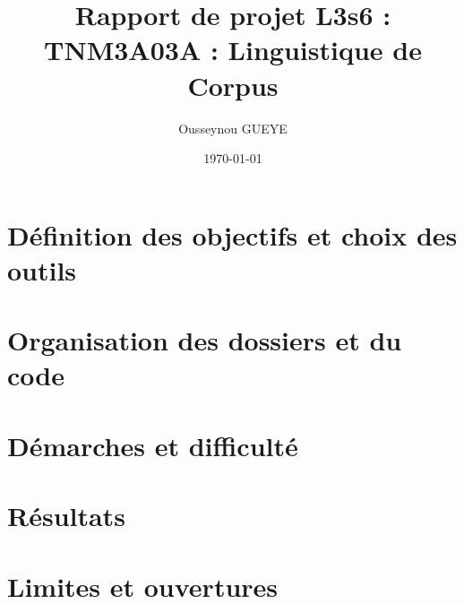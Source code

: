 \documentclass[a4paper,11pt]{report}
\author{Ousseynou GUEYE}
\date{\today}
\title{\textbf{Rapport de projet L3s6 : \\ TNM3A03A : Linguistique de Corpus}}
\begin{document}
\maketitle
\setcounter{tocdepth}{3}
\tableofcontents

\chapter{Définition des objectifs et choix des outils}
\label{sec-1}



\chapter{Organisation des dossiers et du code}
\label{sec-3}



\chapter{Démarches et difficulté}
\label{sec-4}



\chapter{Résultats}
\label{sec-6}



\chapter{Limites et ouvertures}
\label{sec-7}



\end{document}
